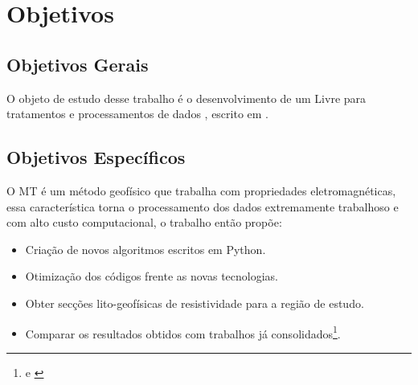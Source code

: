 
\chapter{Objetivos}
\label{cap-objetivos}

\section{Objetivos Gerais}
\label{cap-objetivos gerais}

    
    O objeto de estudo desse trabalho é o desenvolvimento de um  Livre para tratamentos e processamentos de dados \MT, escrito em .
    
\section{Objetivos Específicos}
\label{cap-objetivos especificos}

    O MT é um método geofísico que trabalha com propriedades eletromagnéticas, essa característica torna o processamento dos dados extremamente trabalhoso e com alto custo computacional, o trabalho então propõe:
    
    \begin{itemize}
     \item Criação de novos algoritmos escritos em Python.
     \item Otimização dos códigos frente as novas tecnologias.
     \item Obter secções lito-geofísicas de resistividade para a região de estudo.
     \item Comparar os resultados obtidos com trabalhos já consolidados\footnote{\cite{tese_andrea} e \cite{alane}}.
    \end{itemize}
